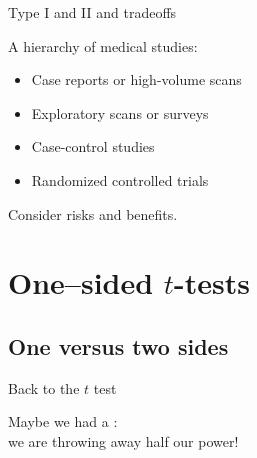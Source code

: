 \begin{frame}{Type I and II and tradeoffs}

    A hierarchy of medical studies:
    \begin{itemize}
        \item Case reports or high-volume scans
        \item Exploratory scans or surveys
        \item Case-control studies
        \item Randomized controlled trials
    \end{itemize}


    \vspace{2em}

    Consider risks and benefits.


\end{frame}



\section{One--sided $t$-tests}

\subsection{One versus two sides}


\begin{frame}{Back to the $t$ test}
    
    Maybe we had a :\\
    we are throwing away half our power!

\end{frame}

